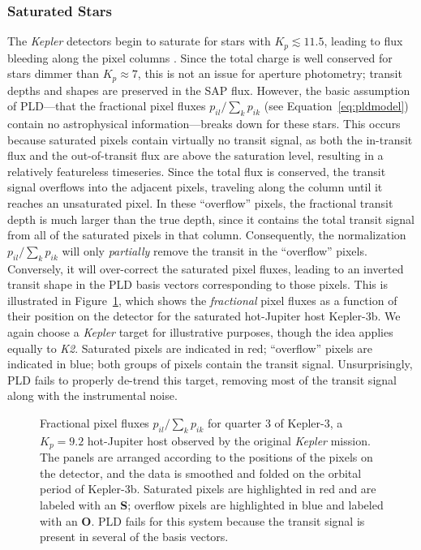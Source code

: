 \documentclass[]{emulateapj}
\begin{document}
\subsubsection{Saturated Stars}
\label{sec:saturated}
The \emph{Kepler} detectors begin to saturate for stars with $K_p \lesssim 11.5$,
leading to flux bleeding along the pixel columns \citep{GIL10}. Since the total
charge is well conserved for stars dimmer than $K_p \approx 7$, this is not an issue for
aperture photometry; transit depths and shapes are preserved in the SAP flux.
However, the basic assumption of PLD---that the fractional pixel fluxes 
$p_{il} / \sum_k{p_{ik}}$ (see Equation~\ref{eq:pldmodel}) contain no astrophysical 
information---breaks down for these stars. This occurs because saturated pixels 
contain virtually no transit signal, as both the in-transit flux and the out-of-transit
flux are above the saturation level, resulting in a relatively featureless
timeseries. Since the total flux is conserved, the transit signal 
overflows into the adjacent pixels, traveling along the column until it reaches
an unsaturated pixel. In these ``overflow'' pixels, the fractional transit
depth is much larger than the true depth, since it contains the total transit signal
from all of the saturated pixels in that column. Consequently, the normalization
$p_{il} / \sum_k{p_{ik}}$ will only \emph{partially} remove the transit in the
``overflow'' pixels. Conversely, it will over-correct the saturated pixel fluxes,
leading to an inverted transit shape in the PLD basis vectors corresponding to 
those pixels. This is illustrated in Figure~\ref{fig:saturation}, which shows the 
\emph{fractional} pixel fluxes as a function of their position on the detector for the saturated
hot-Jupiter host Kepler-3b. We again choose a \emph{Kepler} target for illustrative
purposes, though the idea applies equally to \emph{K2}. Saturated pixels are indicated in red; ``overflow'' pixels
are indicated in blue; both groups of pixels contain the transit signal. Unsurprisingly, 
PLD fails to properly de-trend this target, removing most of the transit signal
along with the instrumental noise.

\begin{figure}[h]
  \begin{center}
       \caption{Fractional pixel fluxes $p_{il} / \sum_k{p_{ik}}$
                for quarter 3 of Kepler-3, a $K_p = 9.2$ hot-Jupiter host
                observed by the original \emph{Kepler} mission. The panels
                are arranged according to the positions of the pixels on
                the detector, and the data is smoothed and folded on the orbital period
                of Kepler-3b. Saturated pixels are highlighted in red and are labeled
                with an \textbf{S};
                overflow pixels are highlighted in blue and labeled with an \textbf{O}. PLD fails for this
                system because the transit signal is present in several of
                the basis vectors.}
     \label{fig:saturation}
  \end{center}
\end{figure}
\end{document}
